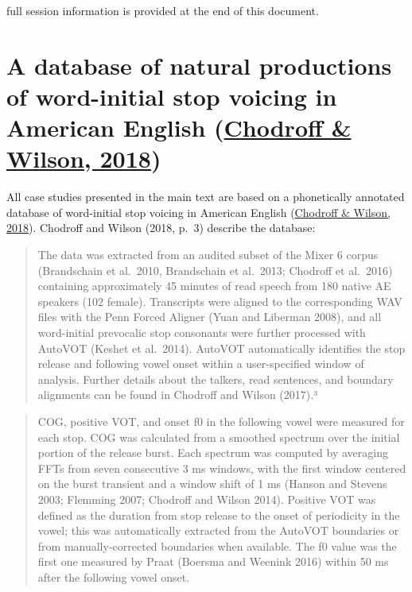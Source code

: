 \documentclass[
  11pt,
  man,floatsintext]{apa6}
\begin{document}
full session information is provided at the end of this document.

\hypertarget{sec:SI-chodroff}{%
\section{\texorpdfstring{A database of natural productions of word-initial stop voicing in American English (\protect\hyperlink{ref-chodroff-wilson2018}{Chodroff \& Wilson, 2018})}{A database of natural productions of word-initial stop voicing in American English (Chodroff \& Wilson, 2018)}}\label{sec:SI-chodroff}}

All case studies presented in the main text are based on a phonetically annotated database of word-initial stop voicing in American English (\protect\hyperlink{ref-chodroff-wilson2018}{Chodroff \& Wilson, 2018}). Chodroff and Wilson (2018, p.~3) describe the database:

\begin{quote}
The data was extracted from an audited subset of the Mixer 6 corpus (Brandschain et al.~2010, Brandschain
et al.~2013; Chodroff et al.~2016) containing approximately 45 minutes of read speech from 180 native AE
speakers (102 female). Transcripts were aligned to the corresponding WAV files with the Penn Forced Aligner
(Yuan and Liberman 2008), and all word-initial prevocalic stop consonants were further processed with
AutoVOT (Keshet et al.~2014). AutoVOT automatically identifies the stop release and following vowel onset
within a user-specified window of analysis. Further details about the talkers, read sentences, and boundary
alignments can be found in Chodroff and Wilson (2017).³
\end{quote}

\begin{quote}
COG, positive VOT, and onset f0 in the following vowel were measured for each stop. COG was calculated
from a smoothed spectrum over the initial portion of the release burst. Each spectrum was computed by averaging
FFTs from seven consecutive 3 ms windows, with the first window centered on the burst transient and
a window shift of 1 ms (Hanson and Stevens 2003; Flemming 2007; Chodroff and Wilson 2014). Positive VOT
was defined as the duration from stop release to the onset of periodicity in the vowel; this was automatically
extracted from the AutoVOT boundaries or from manually-corrected boundaries when available. The
f0 value was the first one measured by Praat (Boersma and Weenink 2016) within 50 ms after the following
vowel onset.
\end{quote}
\end{document}

